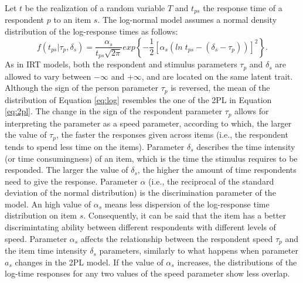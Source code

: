 \documentclass[12pt]{book}
\begin{document}
Let $t$ be the realization of a random variable $T$ and $t_{ps}$ the response time of a respondent $p$ to an item $s$. 
The log-normal model assumes a normal density distribution of the log-response times as follows: 
%
\begin{equation}\label{eq:log}
	f(t_{ps}| \tau_p, \delta_s) = \frac{\alpha_s}{t_{ps}\sqrt{2\pi}}exp\left\{ -\frac{1}{2}[\alpha_s(ln\;t_{ps} - (\delta_s - \tau_p))]^2 \right\}.
\end{equation} 
%
As in IRT models, both the respondent and stimulus parameters $\tau_p$ and $\delta_s$ are allowed to vary between $- \infty$ and $+ \infty$, and are located on the same latent trait. 
Although the sign of the person parameter $\tau_p$ is reversed, the mean of the distribution of Equation \ref{eq:log} resembles the one of the 2PL in Equation \ref{eq:2pl}. 
The change in the sign of the respondent parameter $\tau_p$ allows for interpreting the parameter as a speed parameter, according to which, the larger the value of $\tau_p$, the faster the responses given across items (i.e., the respondent tends to spend less time on the items). 
Parameter $\delta_s$ describes the time intensity (or time consumingness)  of an item, which is the time the stimulus requires to be responded. The larger the value of $\delta_s$, the higher the amount of time respondents need to give the response.
Parameter $\alpha$ (i.e., the reciprocal of the standard deviation of the normal distribution) is the discrimination parameter of the model. An high value of $\alpha_s$ means less dispersion of the log-response time distribution on item $s$. Consequently, it can be said that the item has a better discrimintating ability between different respondents with different levels of speed. 
Parameter $\alpha_s$ affects the relationship between the respondent speed $\tau_p$ and the item time intensity $\delta_s$ parameters, similarly to what happens when parameter $a_s$ changes in the 2PL model. 
If the value of $\alpha_s$ increases, the distributions of the log-time responses for any two values of the speed parameter show less overlap. 
\end{document}
